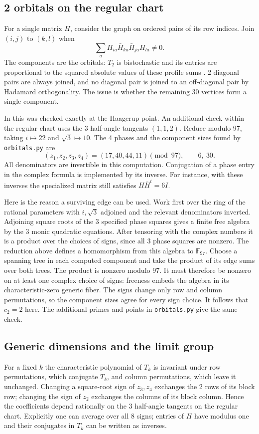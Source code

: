 \documentclass[11pt,a4paper]{amsart}
\begin{document}
\subsection{2 orbitals on the regular chart}
For a single matrix $H$, consider the graph on ordered pairs of its row indices. Join $(i,j)$ to $(k,l)$ when
\[
 \sum_a H_{ia}\bar H_{ka}\bar H_{ja}H_{la}\ne0.
\]
The components are the orbitals: $T_2$ is bistochastic and its entries are proportional to the squared absolute values of these profile sums \cite[Section 2]{bo}. 2 diagonal pairs are always joined, and no diagonal pair is joined to an off-diagonal pair by Hadamard orthogonality. The issue is whether the remaining 30 vertices form a single component.

In \cite[Section 7]{bo} this was checked exactly at the Haagerup point. An additional check within the regular chart uses the 3 half-angle tangents $(1,1,2)$. Reduce modulo 97, taking $i\mapsto22$ and $\sqrt3\mapsto10$. The 4 phases and the component sizes found by \texttt{orbitals.py} are
\[
 (z_1,z_2,z_3,z_4)=(17,40,44,11)\pmod {97},
 \qquad 6,\ 30 .
\]
All denominators are invertible in this computation. Conjugation of a phase entry in the complex formula is implemented by its inverse. For instance, with these inverses the specialized matrix still satisfies $H\bar H^t=6I$.

Here is the reason a surviving edge can be used. Work first over the ring of the rational parameters with $i,\sqrt3$ adjoined and the relevant denominators inverted. Adjoining square roots of the 3 specified phase squares gives a finite free algebra by the 3 monic quadratic equations. After tensoring with the complex numbers it is a product over the choices of signs, since all 3 phase squares are nonzero. The reduction above defines a homomorphism from this algebra to $\mathbb F_{97}$. Choose a spanning tree in each computed component and take the product of its edge sums over both trees. The product is nonzero modulo 97. It must therefore be nonzero on at least one complex choice of signs: freeness embeds the algebra in its characteristic-zero generic fiber. The signs change only row and column permutations, so the component sizes agree for every sign choice. It follows that $c_2=2$ here. The additional primes and points in \texttt{orbitals.py} give the same check.

\subsection{Generic dimensions and the limit group}
For a fixed $k$ the characteristic polynomial of $T_k$ is invariant under row permutations, which conjugate $T_k$, and column permutations, which leave it unchanged. Changing a square-root sign of $z_3,z_4$ exchanges the 2 rows of its block row; changing the sign of $z_2$ exchanges the columns of its block column. Hence the coefficients depend rationally on the 3 half-angle tangents on the regular chart. Explicitly one can average over all 8 signs; entries of $H$ have modulus one and their conjugates in $T_k$ can be written as inverses.
\end{document}
